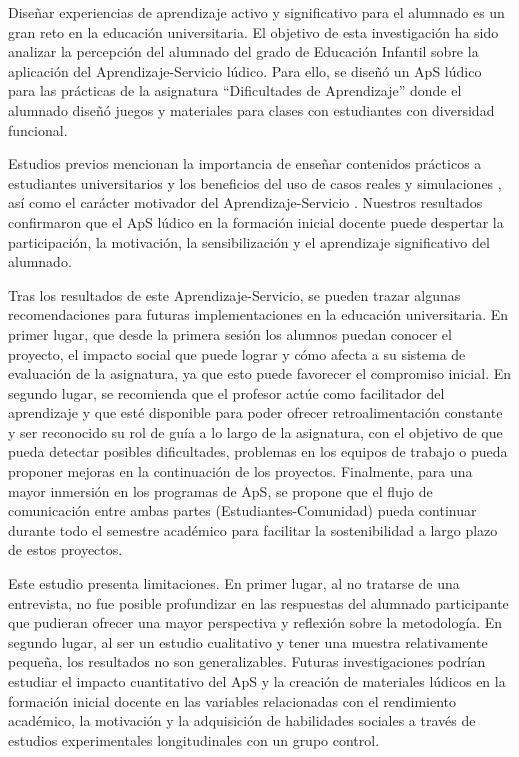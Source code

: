 \documentclass[spanish]{textolivre}
\begin{document}
Diseñar experiencias de aprendizaje activo y significativo para el alumnado es un gran reto en la educación universitaria. El objetivo de esta investigación ha sido analizar la percepción del alumnado del grado de Educación Infantil sobre la aplicación del Aprendizaje-Servicio lúdico. Para ello, se diseñó un ApS lúdico para las prácticas de la asignatura “Dificultades de Aprendizaje” donde el alumnado diseñó juegos y materiales para clases con estudiantes con diversidad funcional.

Estudios previos mencionan la importancia de enseñar contenidos prácticos a estudiantes universitarios y los beneficios del uso de casos reales y simulaciones \cite{kaufman_enhancing_2016,ferreira_simulacion_2021}, así como el carácter motivador del Aprendizaje-Servicio \cite{pu_improvement_2021,resch_using_2021}. Nuestros resultados confirmaron que el ApS lúdico en la formación inicial docente puede despertar la participación, la motivación, la sensibilización y el aprendizaje significativo del alumnado.

Tras los resultados de este Aprendizaje-Servicio, se pueden trazar algunas recomendaciones para futuras implementaciones en la educación universitaria. En primer lugar, que desde la primera sesión los alumnos puedan conocer el proyecto, el impacto social que puede lograr y cómo afecta a su sistema de evaluación de la asignatura, ya que esto puede favorecer el compromiso inicial. En segundo lugar, se recomienda que el profesor actúe como facilitador del aprendizaje y que esté disponible para poder ofrecer retroalimentación constante y ser reconocido su rol de guía a lo largo de la asignatura, con el objetivo de que pueda detectar posibles dificultades, problemas en los equipos de trabajo o pueda proponer mejoras en la continuación de los proyectos. Finalmente, para una mayor inmersión en los programas de ApS, se propone que el flujo de comunicación entre ambas partes (Estudiantes-Comunidad) pueda continuar durante todo el semestre académico para facilitar la sostenibilidad a largo plazo de estos proyectos.

Este estudio presenta limitaciones. En primer lugar, al no tratarse de una entrevista, no fue posible profundizar en las respuestas del alumnado participante que pudieran ofrecer una mayor perspectiva y reflexión sobre la metodología. En segundo lugar, al ser un estudio cualitativo y tener una muestra relativamente pequeña, los resultados no son generalizables. Futuras investigaciones podrían estudiar el impacto cuantitativo del ApS y la creación de materiales lúdicos en la formación inicial docente en las variables relacionadas con el rendimiento académico, la motivación y la adquisición de habilidades sociales a través de estudios experimentales longitudinales con un grupo control.
\end{document}
